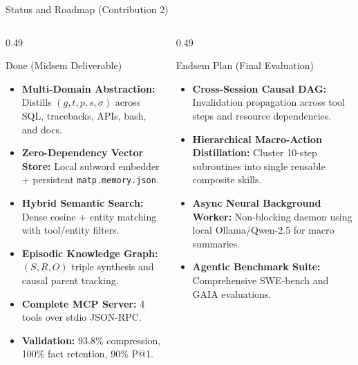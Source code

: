 \documentclass[aspectratio=169,10pt]{beamer}
\begin{document}
\begin{frame}{Status and Roadmap (Contribution 2)}
  \begin{columns}[T,onlytextwidth]
    \begin{column}{0.49\textwidth}
      \begin{block}{Done (Midsem Deliverable)}
        \begin{itemize}
          \footnotesize
          \item \textbf{Multi-Domain Abstraction:} Distills $(g, t, p, s, \sigma)$ across SQL, tracebacks, APIs, bash, and docs.
          \item \textbf{Zero-Dependency Vector Store:} Local subword embedder + persistent \texttt{matp.memory.json}.
          \item \textbf{Hybrid Semantic Search:} Dense cosine + entity matching with tool/entity filters.
          \item \textbf{Episodic Knowledge Graph:} $(S, R, O)$ triple synthesis and causal parent tracking.
          \item \textbf{Complete MCP Server:} 4 tools over stdio JSON-RPC.
          \item \textbf{Validation:} 93.8\% compression, 100\% fact retention, 90\% P@1.
        \end{itemize}
      \end{block}
    \end{column}
    \begin{column}{0.49\textwidth}
      \begin{block}{Endsem Plan (Final Evaluation)}
        \begin{itemize}
          \footnotesize
          \item \textbf{Cross-Session Causal DAG:} Invalidation propagation across tool steps and resource dependencies.
          \item \textbf{Hierarchical Macro-Action Distillation:} Cluster 10-step subroutines into single reusable composite skills.
          \item \textbf{Async Neural Background Worker:} Non-blocking daemon using local Ollama/Qwen-2.5 for macro summaries.
          \item \textbf{Agentic Benchmark Suite:} Comprehensive SWE-bench and GAIA evaluations.
        \end{itemize}
      \end{block}
    \end{column}
  \end{columns}
\end{frame}
\end{document}
